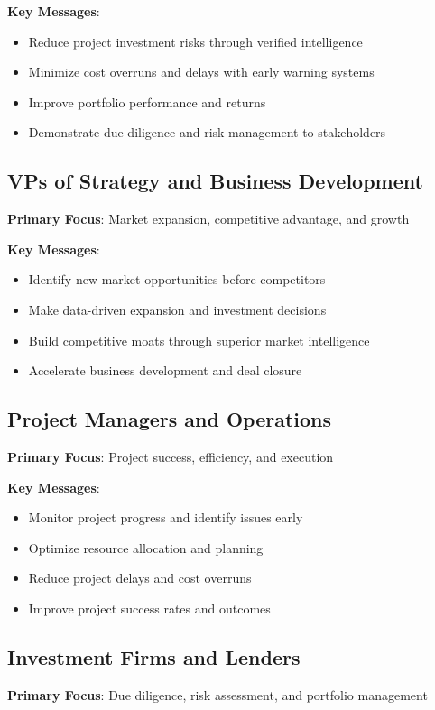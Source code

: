 \documentclass[business]{../templates/infraradar-main}
\begin{document}
\textbf{Key Messages}:
\begin{itemize}
    \item Reduce project investment risks through verified intelligence
    \item Minimize cost overruns and delays with early warning systems
    \item Improve portfolio performance and returns
    \item Demonstrate due diligence and risk management to stakeholders
\end{itemize}

\subsection{VPs of Strategy and Business Development}
\textbf{Primary Focus}: Market expansion, competitive advantage, and growth

\textbf{Key Messages}:
\begin{itemize}
    \item Identify new market opportunities before competitors
    \item Make data-driven expansion and investment decisions
    \item Build competitive moats through superior market intelligence
    \item Accelerate business development and deal closure
\end{itemize}

\subsection{Project Managers and Operations}
\textbf{Primary Focus}: Project success, efficiency, and execution

\textbf{Key Messages}:
\begin{itemize}
    \item Monitor project progress and identify issues early
    \item Optimize resource allocation and planning
    \item Reduce project delays and cost overruns
    \item Improve project success rates and outcomes
\end{itemize}

\subsection{Investment Firms and Lenders}
\textbf{Primary Focus}: Due diligence, risk assessment, and portfolio management
\end{document}
